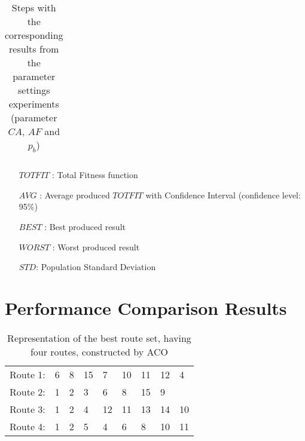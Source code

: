 \begin{table}
\begin{tabular}{|l|l|l|c||c|c|c|c|c|}
    \hline
    \end{tabular}
    \caption {Steps with the corresponding results from the parameter settings experiments (parameter $CA$, $AF$ and $p_b$)}
    \tiny
    \begin{itemize}[noitemsep]
    \item[$TOTFIT$ :] Total Fitness function
    \item[$AVG$ :] Average produced $TOTFIT$ with Confidence Interval (confidence level: 95\%)
    \item[$BEST$ :] Best produced result
    \item[$WORST$ :] Worst produced result
    \item[$STD$:] Population Standard Deviation 
    \end{itemize}
    \label{table:pm2}
\end{table}


\section{Performance Comparison Results}
\label{sec:performanceComparisonAppendix}
\begin{table}[H]
    \centering
    \begin{tabular}{|l|llllllll|}
    \hline
    Route 1: & 6 & 8 & 15 & 7 & 10 & 11 & 12 & 4 \\
    Route 2: & 1 & 2 & 3 & 6 & 8 & 15 & 9 &  \\
    Route 3: & 1 & 2 & 4 & 12 & 11 & 13 & 14 & 10 \\
    Route 4: & 1 & 2 & 5 & 4 & 6 & 8 & 10 & 11 \\
    \hline
    \end{tabular}
    \caption {Representation of the best route set, having four routes, constructed by ACO}
    \label{table:performanceComparison_bestRouteSet4_ACO}
\end{table}

